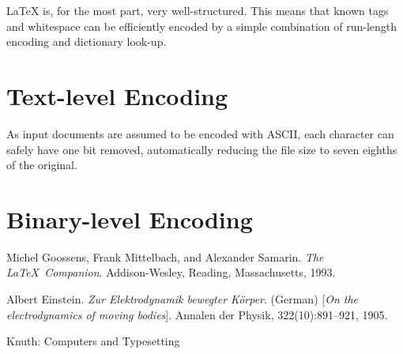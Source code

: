 \documentclass[11pt]{article}
\begin{document}
    \LaTeX{} is, for the most part, very well-structured.
    This means that known tags and whitespace can be efficiently encoded by a simple combination of run-length encoding and dictionary look-up.


    \section{Text-level Encoding}\label{sec:text-level-encoding}
    As input documents are assumed to be encoded with ASCII, each character can safely have one bit removed, automatically reducing the file size to seven eighths of the original.


    \section{Binary-level Encoding}\label{sec:binary-level-encoding}

    \pagebreak

    \begin{thebibliography}{9}
        Michel Goossens, Frank Mittelbach, and Alexander Samarin.
        \textit{The \LaTeX\ Companion}.
        Addison-Wesley, Reading, Massachusetts, 1993.

        Albert Einstein.
        \textit{Zur Elektrodynamik bewegter K{\"o}rper}. (German)
        [\textit{On the electrodynamics of moving bodies}].
        Annalen der Physik, 322(10):891–921, 1905.

        Knuth: Computers and Typesetting
    \end{thebibliography}
\end{document}
